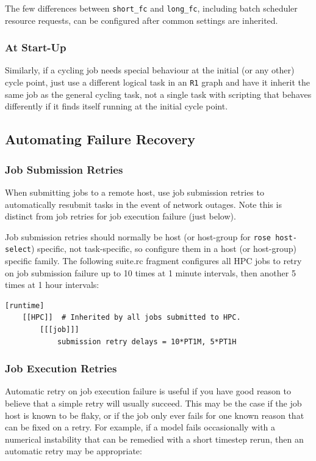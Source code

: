 The few differences between \lstinline=short_fc= and \lstinline=long_fc=,
including batch scheduler resource requests, can be configured after common
settings are inherited.

\subsubsection{At Start-Up}

Similarly, if a cycling job needs special behaviour at the initial (or any other)
cycle point, just use a different logical task in an \lstinline=R1= graph and
have it inherit the same job as the general cycling task, not a single task
with scripting that behaves differently if it finds itself running at the
initial cycle point.

\subsection{Automating Failure Recovery}

\subsubsection{Job Submission Retries}

When submitting jobs to a remote host, use job submission retries to
automatically resubmit tasks in the event of network outages. Note this is
distinct from job retries for job execution failure (just below).

Job submission retries should normally be host (or host-group for
\lstinline=rose host-select=) specific, not task-specific, so configure them in
a host (or host-group) specific family. The following suite.rc fragment
configures all HPC jobs to retry on job submission failure up to 10
times at 1 minute intervals, then another 5 times at 1 hour intervals:

\lstset{language=suiterc}
\begin{lstlisting}
[runtime]
    [[HPC]]  # Inherited by all jobs submitted to HPC.
        [[[job]]]
            submission retry delays = 10*PT1M, 5*PT1H
\end{lstlisting}

\subsubsection{Job Execution Retries}

Automatic retry on job execution failure is useful if you have good reason to
believe that a simple retry will usually succeed. This may be the case if the
job host is known to be flaky, or if the job only ever fails for one known
reason that can be fixed on a retry. For example, if a model fails occasionally
with a numerical instability that can be remedied with a short timestep rerun,
then an automatic retry may be appropriate:

